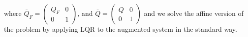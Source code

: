 where 
$\bar{Q}_F = \left(
\begin{array}{cc}
Q_F & 0 \\
0 & 1
\end{array}
\right)$, and 
$\bar{Q} = \left(
\begin{array}{cc}
Q & 0 \\
0 & 1
\end{array}
\right)$ and we solve the affine version of the problem by applying
LQR to the augmented system in the standard way.
